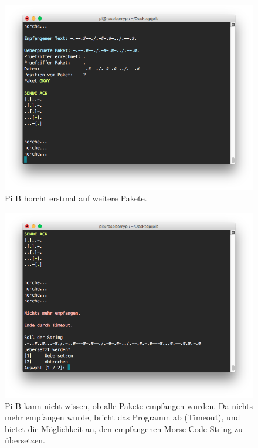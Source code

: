 \documentclass[12pt, a4paper]{article}
\begin{document}
\newpage
\begin{figure}[H]
	\centering
	\includegraphics[width=1.0\textwidth]{sshot_45.png}
	\caption{Pi B horcht erstmal auf weitere Pakete.}
\end{figure}

\newpage
\begin{figure}[H]
	\centering
	\includegraphics[width=1.0\textwidth]{sshot_46.png}
	\caption{Pi B kann nicht wissen, ob alle Pakete empfangen wurden. Da nichts mehr empfangen wurde, bricht das Programm ab (Timeout), und bietet die Möglichkeit an, den empfangenen Morse-Code-String zu übersetzen.}
\end{figure}
\end{document}
